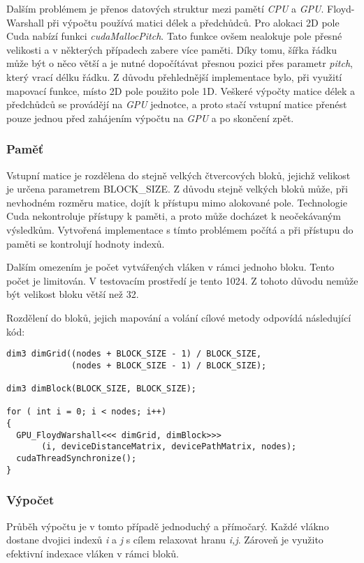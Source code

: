 \documentclass[a4paper,11pt]{article}
\begin{document}
    Dalším problémem je přenos datových struktur mezi pamětí \textit{CPU} a \textit{GPU}. Floyd-Warshall při výpočtu používá 
    matici délek a předchůdců. Pro alokaci 2D pole Cuda nabízí funkci \textit{cudaMallocPitch}. Tato funkce 
    ovšem nealokuje pole přesné velikosti a v některých případech zabere více paměti. Díky tomu, šířka 
    řádku může být o něco větší a je nutné dopočítávat přesnou pozici přes parametr \textit{pitch}, který 
    vrací délku řádku. Z důvodu přehlednější implementace bylo, při využití mapovací funkce, místo 2D
    pole použito pole 1D. Veškeré výpočty matice délek a předchůdců se provádějí na \textit{GPU} jednotce, a proto
    stačí vstupní matice přenést pouze jednou před zahájením výpočtu na \textit{GPU} a po skončení zpět.
    
    \subsubsection{Paměť}
     Vstupní matice je rozdělena do stejně velkých čtvercových bloků, jejichž velikost je určena parametrem
     BLOCK\_SIZE. Z důvodu stejně velkých bloků může, při nevhodném rozměru matice, dojít k přístupu mimo 
     alokované pole. Technologie Cuda nekontroluje přístupy k paměti, a proto může docházet k neočekávaným 
     výsledkům. Vytvořená implementace s tímto problémem počítá a při přístupu do paměti se kontrolují 
     hodnoty indexů. 
     
     Dalším omezením je počet vytvářených vláken v rámci jednoho bloku. Tento počet je limitován. V testovacím 
     prostředí je tento 1024. Z tohoto důvodu nemůže být velikost bloku větší než 32.
     
     Rozdělení do bloků, jejich mapování a volání cílové metody odpovídá následující kód:
         \lstset {language=C++}
    \begin{lstlisting}
dim3 dimGrid((nodes + BLOCK_SIZE - 1) / BLOCK_SIZE,
             (nodes + BLOCK_SIZE - 1) / BLOCK_SIZE);

dim3 dimBlock(BLOCK_SIZE, BLOCK_SIZE);

for ( int i = 0; i < nodes; i++)
{
  GPU_FloydWarshall<<< dimGrid, dimBlock>>>
       (i, deviceDistanceMatrix, devicePathMatrix, nodes);
  cudaThreadSynchronize();
}	  
    \end{lstlisting}
    
    
    \subsubsection{Výpočet}
    Průběh výpočtu je v tomto případě jednoduchý a přímočarý. Každé vlákno dostane dvojici indexů
    \textit{i} a \textit{j} s cílem relaxovat hranu \textit{i,j}. Zároveň je využito efektivní indexace
    vláken v rámci bloků.
    
\end{document}
